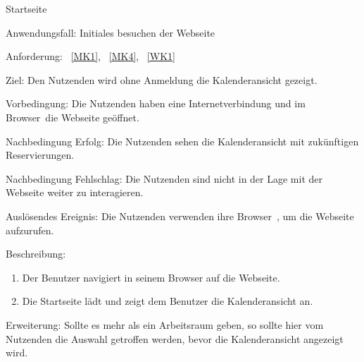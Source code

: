 \begin{function}{10}{Startseite}
    \item[Anwendungsfall:] Initiales besuchen der Webseite
    \item[Anforderung:]~\ref{MK1}, ~\ref{MK4}, ~\ref{WK1}
    \item[Ziel:] Den Nutzenden wird ohne Anmeldung die Kalenderansicht gezeigt.
    \item[Vorbedingung:] Die Nutzenden haben eine Internetverbindung und im \gls{Browser}~die Webseite geöffnet.
    \item[Nachbedingung Erfolg:] Die Nutzenden sehen die Kalenderansicht mit zukünftigen Reservierungen.
    \item[Nachbedingung Fehlschlag:] Die Nutzenden sind nicht in der Lage mit der Webseite weiter zu interagieren.
    \item[Auslösendes Ereignis:] Die Nutzenden verwenden ihre \gls{Browser}~, um die Webseite aufzurufen.
    \item[Beschreibung:]~
    \begin{enumerate}
        \item Der Benutzer navigiert in seinem Browser auf die Webseite.
        \item Die Startseite lädt und zeigt dem Benutzer die Kalenderansicht an.
    \end{enumerate}
    \item[Erweiterung:] Sollte es mehr als ein Arbeitsraum geben, so sollte hier vom Nutzenden die Auswahl getroffen werden, bevor die Kalenderansicht angezeigt wird.
\end{function}

\pagebreak


